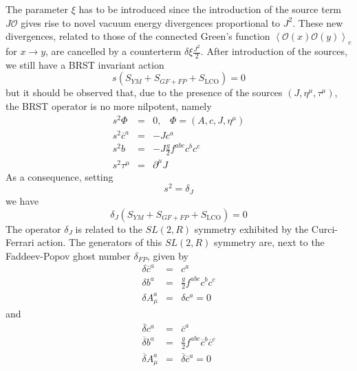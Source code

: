 \documentclass[a4paper,12pt]{article}
\begin{document}
The parameter $\xi$ has to be introduced since the introduction of the
source term $J\mathcal{O}$ gives rise to novel vacuum energy divergences
proportional to $J^{2}$. These new divergences, related to those of the
connected Green's function $\left\langle \mathcal{O}(x)\mathcal{O}%
(y)\right\rangle_{c}$ for $x\rightarrow y$, are cancelled by a counterterm $%
\delta\xi\frac{J^{2}}{2}$. \newline
\newline
After introduction of the sources, we still have a BRST invariant action
\begin{equation}
s\left( S_{YM}+S_{GF+FP}+S_{\mathrm{LCO}}\right) =0  \label{sinv}
\end{equation}
but it should be observed that, due to the presence of the sources $\left(
J,\eta ^{\mu },\tau ^{\mu }\right) $, the BRST operator is no more
nilpotent, namely
\begin{eqnarray}
s^{2}\Phi &=&0,\;\;\;\Phi =(A,c,J,\eta ^{\mu })  \nonumber \\
s^{2}\overline{c}^{a} &=&-Jc^{a}  \nonumber \\
s^{2}b &=&-J\frac{g}{2}f^{abc}c^{b}c^{c}  \nonumber \\
s^{2}\tau ^{\mu } &=&\partial ^{\mu }J  \label{s2}
\end{eqnarray}
As a consequence, setting
\begin{equation}
s^{2}=\delta _{J}  \label{dj}
\end{equation}
we have
\begin{equation}
\delta _{J}\left( S_{YM}+S_{GF+FP}+S_{\mathrm{LCO}}\right) =0  \label{djinv}
\end{equation}
The operator $\delta _{J}\;$is related to the $SL(2,R)$ symmetry \cite
{Delbourgo:1981cm,Baulieu:sb,Dudal:2002ye} exhibited by the Curci-Ferrari
action. The generators of this $SL(2,R)$ symmetry are, next to the
Faddeev-Popov ghost number $\delta_{FP}$, given by
\begin{eqnarray}
\delta \overline{c}^{a} &=&c^{a}  \nonumber \\
\delta b^{a} &=&\frac{g}{2}f^{abc}c^{b}c^{c}  \nonumber \\
\delta A_{\mu }^{a} &=&\delta c^{a}=0  \label{df}
\end{eqnarray}
and
\begin{eqnarray}
\overline{\delta} c^{a} &=&\overline{c}^{a}  \nonumber \\
\overline{\delta} b^{a} &=&\frac{g}{2}f^{abc}\overline{c}^{b}\overline{c}^{c}
\nonumber \\
\overline{\delta} A_{\mu }^{a} &=&\overline{\delta} \overline{c}^{a}=0
\label{dfbar}
\end{eqnarray}
\end{document}
